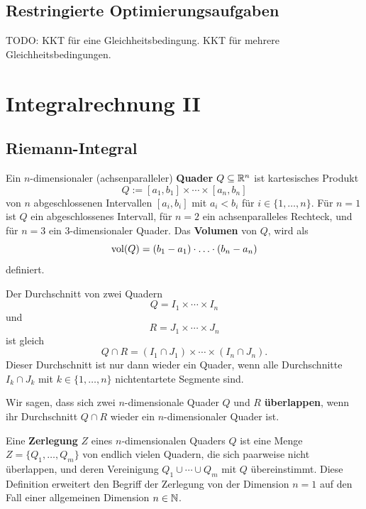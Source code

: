 \section{Restringierte Optimierungsaufgaben} 

TODO: KKT für eine Gleichheitsbedingung. KKT für mehrere Gleichheitsbedingungen. 

\chapter{Integralrechnung II}


\section{Riemann-Integral} 

\begin{defn}
	Ein $n$-dimensionaler (achsenparalleler) \textbf{Quader}  $Q \subseteq \mathbb{R}^n$ ist kartesisches Produkt 
	\[
		Q := [a_1,b_1] \times \cdots \times [a_n,b_n]
	\] 
	von $n$ abgeschlossenen Intervallen $[a_i,b_i]$ mit $a_i < b_i$ für $i \in \{1,\ldots,n\}$. Für $n=1$ist $Q$ ein abgeschlossenes Intervall, für $n=2$ ein achsenparalleles Rechteck, und für $n=3$ ein $3$-dimensionaler Quader. Das \textbf{Volumen} von $Q$, wird als 
	\[
		\operatorname{vol}(Q) = (b_1-a_1) \cdot \ldots \cdot (b_n - a_n)
	\]
	definiert. 
\end{defn} 

\begin{bem}
	Der Durchschnitt von zwei Quadern 
	\[
		Q = I_1 \times \cdots \times I_n
	\]
	und 
	\[
		R = J_1  \times \cdots \times J_n
	\]
	ist gleich 
	\[
		Q \cap R = (I_1 \cap J_1) \times \cdots \times (I_n \cap J_n). 
	\]
	Dieser Durchschnitt ist nur dann wieder ein Quader, wenn alle Durchschnitte $I_k \cap J_k$ mit $k \in \{1,\ldots,n\}$ nichtentartete Segmente sind.
\end{bem} 

\begin{defn}
	Wir sagen, dass sich zwei $n$-dimensionale Quader $Q$ und $R$ \textbf{überlappen}, wenn ihr Durchschnitt $Q \cap R$ wieder ein $n$-dimensionaler Quader ist. 
\end{defn} 

\begin{defn} 
	Eine \textbf{Zerlegung} $Z$ eines $n$-dimensionalen Quaders $Q$ ist eine Menge $Z = \{Q_1,\ldots,Q_m\}$ von endlich vielen Quadern, die sich paarweise nicht überlappen, und deren Vereinigung $Q_1 \cup \cdots \cup Q_m$ mit $Q$ übereinstimmt. Diese Definition erweitert den Begriff der Zerlegung von der Dimension $n=1$ auf den Fall einer allgemeinen Dimension $n \in \mathbb{N}$. 
\end{defn} 

